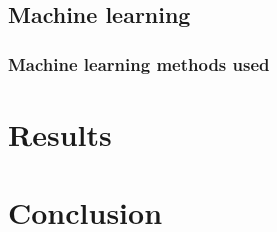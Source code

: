 \documentclass[hidelinks,12pt,oneside]{report} %
\begin{document}
\section{Machine learning}

\subsection{Machine learning methods used}

\chapter{Results}

\chapter{Conclusion}


\printbibliography
 
\end{document}
